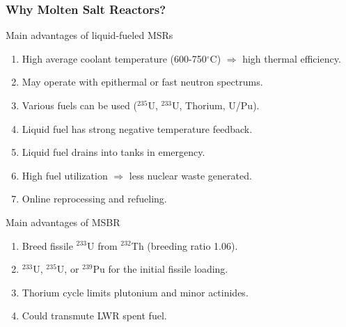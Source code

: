 \begin{frame}
  \frametitle{Why Molten Salt Reactors?}
                  \vspace*{-0.1in}
              \begin{block}{Main advantages of liquid-fueled \glspl{MSR}\cite{elsheikh_safety_2013}}
               \begin{enumerate}
                \item High average coolant temperature (600-750$^{\circ}$C) $\Rightarrow$ high thermal efficiency.
                \item May operate with epithermal or fast neutron spectrums.
                \item Various fuels can be used ($^{235}$U, $^{233}$U, Thorium, U/Pu).
                \item Liquid fuel has strong negative temperature feedback.
                \item Liquid fuel drains into tanks in emergency.
                \item High fuel utilization $\Rightarrow$ less nuclear waste generated.
                \item Online reprocessing and refueling.
               \end{enumerate}
               \end{block}
                  \vspace*{-0.1in}               
               \begin{block}{Main advantages of \gls{MSBR}\cite{robertson_conceptual_1971}}
               \begin{enumerate}
                \item Breed fissile $^{233}$U from $^{232}$Th (breeding ratio 1.06).
                \item $^{233}$U, $^{235}$U, or $^{239}$Pu for the initial fissile loading.
                \item Thorium cycle limits plutonium and minor actinides.
                \item Could transmute \gls{LWR} spent fuel.
               \end{enumerate}
               \end{block}

\end{frame}

